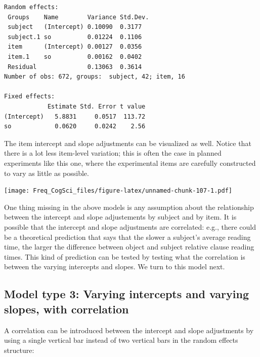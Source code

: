 \documentclass[12pt,]{krantz}
\newenvironment{Shaded}{\begin{snugshade}}{\end{snugshade}}
\newcommand{\DataTypeTok}[1]{\textcolor[rgb]{0.13,0.29,0.53}{#1}}
\newcommand{\KeywordTok}[1]{\textcolor[rgb]{0.13,0.29,0.53}{\textbf{#1}}}
\newcommand{\NormalTok}[1]{#1}
\newcommand{\OperatorTok}[1]{\textcolor[rgb]{0.81,0.36,0.00}{\textbf{#1}}}
\newcommand{\OtherTok}[1]{\textcolor[rgb]{0.56,0.35,0.01}{#1}}
\begin{document}
\begin{verbatim}
Random effects:
 Groups    Name        Variance Std.Dev.
 subject   (Intercept) 0.10090  0.3177  
 subject.1 so          0.01224  0.1106  
 item      (Intercept) 0.00127  0.0356  
 item.1    so          0.00162  0.0402  
 Residual              0.13063  0.3614  
Number of obs: 672, groups:  subject, 42; item, 16

Fixed effects:
            Estimate Std. Error t value
(Intercept)   5.8831     0.0517  113.72
so            0.0620     0.0242    2.56
\end{verbatim}

The item intercept and slope adjustments can be visualized as well. Notice that there is a lot less item-level variation; this is often the case in planned experiments like this one, where the experimental items are carefully constructed to vary as little as possible.

\begin{Shaded}
\end{Shaded}

\texttt{[image: Freq\_CogSci\_files/figure-latex/unnamed-chunk-107-1.pdf]}

One thing missing in the above models is any assumption about the relationship between the intercept and slope adjustements by subject and by item. It is possible that the intercept and slope adjustments are correlated: e.g., there could be a theoretical prediction that says that the slower a subject's average reading time, the larger the difference between object and subject relative clause reading times. This kind of prediction can be tested by testing what the correlation is between the varying intercepts and slopes. We turn to this model next.

\hypertarget{model-type-3-varying-intercepts-and-varying-slopes-with-correlation}{%
\subsection{Model type 3: Varying intercepts and varying slopes, with correlation}\label{model-type-3-varying-intercepts-and-varying-slopes-with-correlation}}

A correlation can be introduced between the intercept and slope adjustments by using a single vertical bar instead of two vertical bars in the random effects structure:
\end{document}
